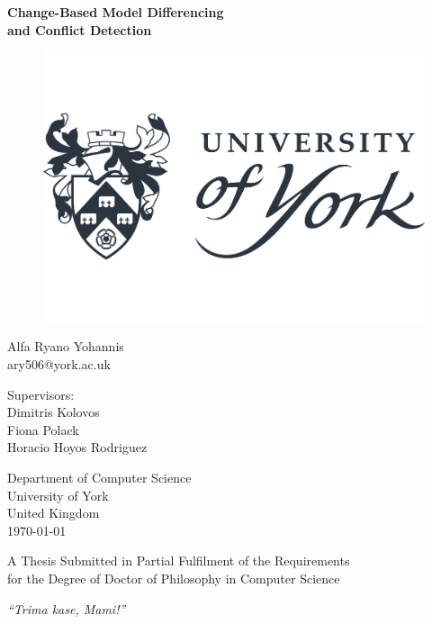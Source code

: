\documentclass[11pt, a4paper]{report} \usepackage[titletoc]{appendix}
\begin{document}
  
  \begin{titlepage}
    \begin{center}
      
      \textbf{\Large Change-Based Model Differencing\\and Conflict Detection}
      
      \vfill
      \begin{figure}[ht]
        \centering
        \includegraphics[width=0.5\linewidth]{uoy}
        \label{fig:uoy}
      \end{figure}
      \vfill
      
      Alfa Ryano Yohannis\\
      ary506@york.ac.uk
      
      \vspace{1cm}
      
      Supervisors:\\
      Dimitris Kolovos\\
      Fiona Polack\\
      Horacio Hoyos Rodriguez
      \vspace{1cm}
      
      Department of Computer Science\\
      University of York\\
      United Kingdom\\
      \vspace{1cm}
      \today
      
      \vfill
      A Thesis Submitted in Partial Fulfilment of the Requirements\\
      for the Degree of Doctor of Philosophy in Computer Science
      
    \end{center}
  \end{titlepage}
  
  \cleardoublepage
  \thispagestyle{empty}  
  \begin{center}
    \vspace*{5cm}
    \LARGE \emph{``Trima kase, Mami!''}
  \end{center}
\end{document}

